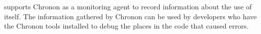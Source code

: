 \app{} supports Chronon as a monitoring agent to record information about the use of \app{} itself.
The information gathered by Chronon can be used by developers who have the Chronon tools installed to debug the places in the code that caused errors. 


